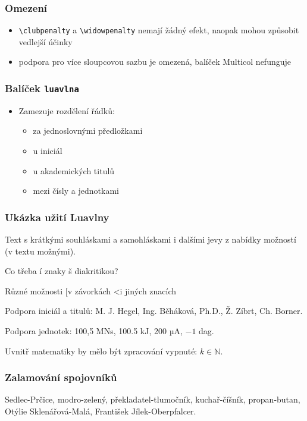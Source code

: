 \begin{frame}[fragile]
  \frametitle{Omezení}
    \begin{itemize}
      \item \verb|\clubpenalty| a \verb|\widowpenalty| nemají žádný efekt, naopak mohou způsobit vedlejší účinky
      \item  podpora pro více sloupcovou sazbu je omezená, balíček Multicol nefunguje
  \end{itemize}
\end{frame}
 

\begin{frame}[fragile]
  \frametitle{Balíček \texttt{luavlna}}
  \begin{itemize}
    \item Zamezuje rozdělení řádků:
      \begin{itemize}
        \item za jednoslovnými předložkami
        \item u iniciál
        \item u akademických titulů
        \item mezi čísly a jednotkami
      \end{itemize}
  \end{itemize}
\end{frame}

\begin{frame}
  \frametitle{Ukázka užití Luavlny}
  \begin{minipage}{3in}

    \preventsingledebugon

    Text s krátkými souhláskami a samohláskami i dalšími jevy
    z nabídky možností (v textu možnými).

    Co třeba í znaky š diakritikou?

    Různé možnosti [v závorkách \textless i jiných znacích

    Podpora iniciál a titulů: M. J. Hegel, Ing. Běháková, Ph.D., Ž. Zíbrt,
    Ch. Borner.

    Podpora jednotek: 100,5 MN\cdot{}s, 100.5 kJ, 200 µA, $-1$ dag.

    Uvnitř matematiky by mělo být zpracování vypnuté: $k \in \mathbb N$.

    \preventsingledebugoff
  \end{minipage}
\end{frame}

\begin{frame}
    \frametitle{Zalamování spojovníků}
    \begin{center}
    \begin{minipage}{2in}
      Sedlec-Prčice, modro-zelený, překladatel-tlumočník, kuchař-číšník, propan-butan, Otýlie Sklenářová-Malá, František Jílek-Oberpfalcer.
    \end{minipage}
  \end{center}
\end{frame}

